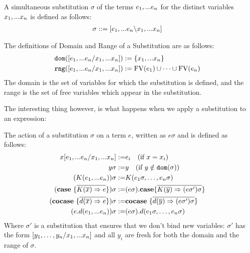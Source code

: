 \documentclass[twoside,12pt,a4paper]{article}
\begin{document}
\begin{definition}[Substitution]
    A simultaneous substitution $\sigma$ of the terms $e_1,...e_n$ for the distinct variables $x_1,...x_n$ is defined as follows:
    \begin{align*} %
        \sigma ::= [\listofexpr \backslash\listofvar]
    \end{align*}
\end{definition}

\begin{definition}
    The definitions of Domain and Range of a Substitution are as follows:
    \begin{align*}
        \texttt{dom}([e_1,...e_n/x_1,...x_n]) &:= \{x_1,...x_n\}\\
        \texttt{rng}([e_1,...e_n/x_1,...x_n]) &:= \text{FV}(e_1)\cup \dots\cup\text{FV}(e_n)
    \end{align*}
    The domain is the set of variables for which the substitution is defined, and
    the range is the set of free variables which appear in the substitution. 
\end{definition}

The interesting thing however, is what happens when we apply a substitution to an expression:

\begin{definition}
    The action of a substitution $\sigma$ on a term $e$, written as $e \sigma$ and is defined as follows:
    \begin{align*}
        x[e_1,...e_n / x_1,...x_n] :=& e_i \quad(\text{if } x=x_i) \\
        y\sigma :=& y\quad (\text{if }y\notin \texttt{dom}(\sigma))\\
        (K(e_1,...e_n))\sigma :=& K(e_1 \sigma,\dots , e_n \sigma)\\
        (\textbf{case}\ \{\overline{K(\overline{x})\Rightarrow e}\})\sigma:=& (e\sigma).\textbf{case}\{\overline{K(\overline{y})\Rightarrow (e\sigma')\sigma}\}\\
        (\textbf{cocase}\ \{\overline{d(\overline{x})\Rightarrow e}\})\sigma:=& \textbf{cocase}\ \{\overline{d(\overline{y})\Rightarrow(e\sigma')\sigma}\}\\
        (e.d(e_1,...e_n)) \sigma:=& (e \sigma).d(e_1 \sigma,\dots , e_n \sigma)
    \end{align*} 
    Where $\sigma'$ is a substitution that ensures that we don't bind new variables: 
    $\sigma'$ has the form $[y_1,\dots, y_n/x_1,...x_n]$ and all $y_i$ are fresh for both the domain and the range of $\sigma$.
\end{definition}
\end{document}
